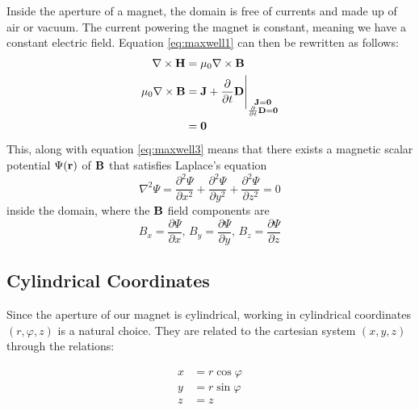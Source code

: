 Inside the aperture of a magnet, the domain is free of currents and made
up of air or vacuum. The current powering the magnet is constant,
meaning we have a constant electric field. Equation \ref{eq:maxwell1}
can then be rewritten as follows:
\begin{align}
    \begin{split}
        \nabla \times \vb{H} &= \mu_0\nabla \times \vb{B}\\
        \mu_0\nabla \times \vb{B}
        &=\vb{J} + \frac{\partial}{\partial t}\vb{D}
        \Bigg\vert_{\substack{\vb{J}=\vb{0} \\
                \frac{\partial}{\partial t}\vb{D}=\vb{0}}} \\
        &= \vb{0}
    \end{split}
\end{align}
This, along with equation \ref{eq:maxwell3} means that there
exists a magnetic scalar potential $\Psi(\vb{r})$ of $\vb{B}$ that satisfies
Laplace's equation
\begin{equation}
    \nabla^2\Psi = \frac{\partial^2 \Psi}{\partial x^2}
    + \frac{\partial^2 \Psi}{\partial y^2}
    + \frac{\partial^2 \Psi}{\partial z^2} = 0
    \label{eq:laplacian_zero}
\end{equation}
inside the domain, where the $\vb{B}$ field components are
\begin{equation}
    B_x = \frac{\partial \Psi}{\partial x}, \,
    B_y = \frac{\partial \Psi}{\partial y}, \,
    B_z = \frac{\partial \Psi}{\partial z}
\end{equation}
\subsection{Cylindrical Coordinates}
Since the aperture of our magnet is cylindrical, working in cylindrical
coordinates $(r, \varphi, z)$ is a natural choice. They are related to the cartesian
system $(x, y, z)$ through the relations:

\begin{align}
    \begin{split}
        x &= r\cos \varphi \\
        y &= r\sin \varphi \\
        z &= z
    \end{split}
\end{align}


